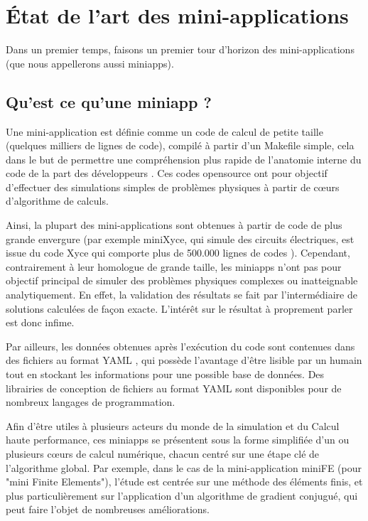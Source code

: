\documentclass[11pt,a4paper,oneside]{memoir}
\theoremstyle{definition}
\theoremstyle{remark}
\theoremstyle{plain}
\begin{document}
\newpage


\chapter{\'Etat de l'art des mini-applications}

Dans un premier temps, faisons un premier tour d'horizon des mini-applications (que nous appellerons aussi miniapps).

\section{Qu'est ce qu'une miniapp ?}

Une mini-application est définie comme un code de calcul de petite taille (quelques milliers de lignes de code), compilé à partir d'un Makefile simple, cela dans le but de permettre une compréhension plus rapide de l'anatomie interne du code de la part des développeurs \cite{sandia2009}. Ces codes opensource ont pour objectif d'effectuer des simulations simples de problèmes physiques à partir de cœurs d'algorithme de calculs.

Ainsi, la plupart des mini-applications sont obtenues à partir de code de plus grande envergure (par exemple miniXyce, qui simule des circuits électriques, est issue du code Xyce qui comporte plus de 500.000 lignes de codes \cite{sandia2009}). Cependant, contrairement à leur homologue de grande taille, les miniapps n'ont pas pour objectif principal de simuler des problèmes physiques complexes ou inatteignable analytiquement. En effet, la validation des résultats se fait par l'intermédiaire de solutions calculées de façon exacte. L'intérêt sur le résultat à proprement parler est donc infime.

Par ailleurs, les données obtenues après l'exécution du code sont contenues dans des fichiers au format YAML \cite{yaml}, qui possède l'avantage d'être lisible par un humain tout en stockant les informations pour une possible base de données. Des librairies de conception de fichiers au format YAML sont disponibles pour de nombreux langages de programmation.\bigskip

Afin d'être utiles à plusieurs acteurs du monde de la simulation et du Calcul haute performance, ces miniapps se présentent sous la forme simplifiée d'un ou plusieurs cœurs de calcul numérique, chacun centré sur une étape clé de l'algorithme global. Par exemple, dans le cas de la mini-application miniFE (pour "mini Finite Elements"), l'étude est centrée sur une méthode des éléments finis, et plus particulièrement sur l'application d'un algorithme de gradient conjugué, qui peut faire l'objet de nombreuses améliorations.
\end{document}
